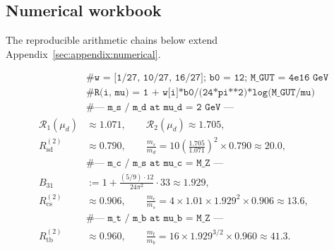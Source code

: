 \subsection{Numerical workbook}
\label{sec:quark-precision:workbook}

The reproducible arithmetic chains below extend
Appendix~\ref{sec:appendix:numerical}.

\begin{equation}\label{eq:workbook-quark-masses}
\begin{aligned}
  &\texttt{\# w = [1/27, 10/27, 16/27]; b0 = 12; M\_GUT = 4e16 GeV}\\
  &\texttt{\# R(i, mu) = 1 + w[i]*b0/(24*pi**2)*log(M\_GUT/mu)}\\
  &\texttt{\# --- m\_s / m\_d at mu\_d = 2 GeV ---}\\
  \mathcal{R}_1(\mu_d) &\approx 1.071,\qquad
  \mathcal{R}_2(\mu_d) \approx 1.705,\\
  R_{\mathrm{sd}}^{(2)} &\approx 0.790,
  \qquad
  \frac{m_s}{m_d}
  = 10\left(\frac{1.705}{1.071}\right)^{\!2}\times 0.790
  \approx 20.0,\\
  &\texttt{\# --- m\_c / m\_s at mu\_c = M\_Z ---}\\
  B_{31} &:= 1+\frac{(5/9)\cdot 12}{24\pi^2}\cdot 33 \approx 1.929,\\
  R_{\mathrm{cs}}^{(2)} &\approx 0.906,
  \qquad
  \frac{m_c}{m_s}
  = 4\times 1.01\times 1.929^{2}\times 0.906
  \approx 13.6,\\
  &\texttt{\# --- m\_t / m\_b at mu\_b = M\_Z ---}\\
  R_{\mathrm{tb}}^{(2)} &\approx 0.960,
  \qquad
  \frac{m_t}{m_b}
  = 16\times 1.929^{3/2}\times 0.960
  \approx 41.3.
\end{aligned}
\end{equation}

